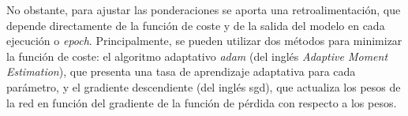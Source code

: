 \vspace{3mm}

No obstante, para ajustar las ponderaciones se aporta una retroalimentación, que depende directamente de la función de coste y de la salida del modelo en cada ejecución o \textit{epoch}. Principalmente, se pueden utilizar dos métodos para minimizar la función de coste: el algoritmo adaptativo \textit{adam} (del inglés \textit{Adaptive Moment Estimation}), que presenta una tasa de aprendizaje adaptativa para cada parámetro, y el gradiente descendiente (del inglés \gls{sgd}), que actualiza los pesos de la red en función del gradiente de la función de pérdida con respecto a los pesos. \cite{ibmann}

\pagebreak